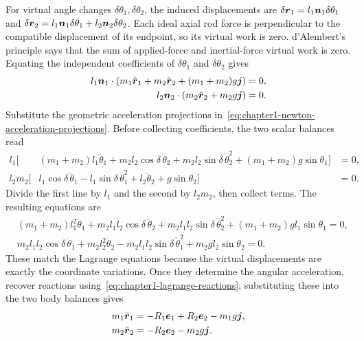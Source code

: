 \documentclass[../main.tex]{subfiles}
\begin{document}
For virtual angle changes $\delta\theta_1,\delta\theta_2$, the induced displacements are $\delta\boldsymbol{r}_1=l_1\boldsymbol{n}_1\delta\theta_1$ and $\delta\boldsymbol{r}_2=l_1\boldsymbol{n}_1\delta\theta_1+l_2\boldsymbol{n}_2\delta\theta_2$. Each ideal axial rod force is perpendicular to the compatible displacement of its endpoint, so its virtual work is zero. d'Alembert's principle says that the sum of applied-force and inertial-force virtual work is zero. Equating the independent coefficients of $\delta\theta_1$ and $\delta\theta_2$ gives
\begin{equation}
\begin{aligned}
l_1\boldsymbol{n}_1\cdot\left(m_1\ddot{\boldsymbol{r}}_1+m_2\ddot{\boldsymbol{r}}_2
+(m_1+m_2)g\boldsymbol{j}\right)&=0,\\
l_2\boldsymbol{n}_2\cdot\left(m_2\ddot{\boldsymbol{r}}_2+m_2g\boldsymbol{j}\right)&=0.
\end{aligned}
\label{eq:chapter1-virtual-work-double-pendulum}
\end{equation}
Substitute the geometric acceleration projections in~\eqref{eq:chapter1-newton-acceleration-projections}. Before collecting coefficients, the two scalar balances read
\begin{equation}
\begin{aligned}
l_1\bigl[&(m_1+m_2)l_1\ddot\theta_1
+m_2l_2\cos\delta\,\ddot\theta_2
+m_2l_2\sin\delta\,\dot\theta_2^2
+(m_1+m_2)g\sin\theta_1\bigr]&=0,\\
l_2m_2\bigl[&l_1\cos\delta\,\ddot\theta_1
-l_1\sin\delta\,\dot\theta_1^2
+l_2\ddot\theta_2+g\sin\theta_2\bigr]&=0.
\end{aligned}
\label{eq:chapter1-virtual-work-uncollected}
\end{equation}
Divide the first line by $l_1$ and the second by $l_2m_2$, then collect terms. The resulting equations are
\begin{equation}
\begin{aligned}
&(m_1+m_2)l_1^2\ddot\theta_1+m_2l_1l_2\cos\delta\,\ddot\theta_2
+m_2l_1l_2\sin\delta\,\dot\theta_2^2
+(m_1+m_2)gl_1\sin\theta_1=0,\\
&m_2l_1l_2\cos\delta\,\ddot\theta_1+m_2l_2^2\ddot\theta_2
-m_2l_1l_2\sin\delta\,\dot\theta_1^2
+m_2gl_2\sin\theta_2=0.
\end{aligned}
\label{eq:chapter1-virtual-work-reduced-eom}
\end{equation}
These match the Lagrange equations because the virtual displacements are exactly the coordinate variations. Once they determine the angular acceleration, recover reactions using~\eqref{eq:chapter1-lagrange-reactions}; substituting these into the two body balances gives
\begin{equation}
\begin{aligned}
m_1\ddot{\boldsymbol{r}}_1 &= -R_1\boldsymbol{e}_1+R_2\boldsymbol{e}_2-m_1g\boldsymbol{j},\\
m_2\ddot{\boldsymbol{r}}_2 &= -R_2\boldsymbol{e}_2-m_2g\boldsymbol{j}.
\end{aligned}
\label{eq:chapter1-virtual-work-common-form}
\end{equation}
\end{document}
